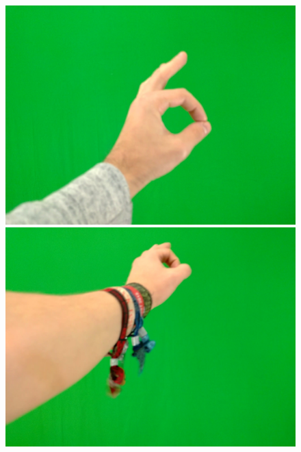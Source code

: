 \begin{figure}[htb]
\begin{minipage}[c]{0.19\linewidth}
   \end{minipage} 
   \begin{minipage}[c]{0.19\linewidth}
      \includegraphics[width=0.95\linewidth]{figures/g2-8.jpg}
   \end{minipage} 
   \begin{minipage}[c]{0.19\linewidth}
      \includegraphics[width=0.95\linewidth]{figures/g2-10.jpg}
   \end{minipage} \\      
   \vspace{1em}
   \begin{minipage}[c]{0.19\linewidth}

\end{minipage}
\end{figure}
